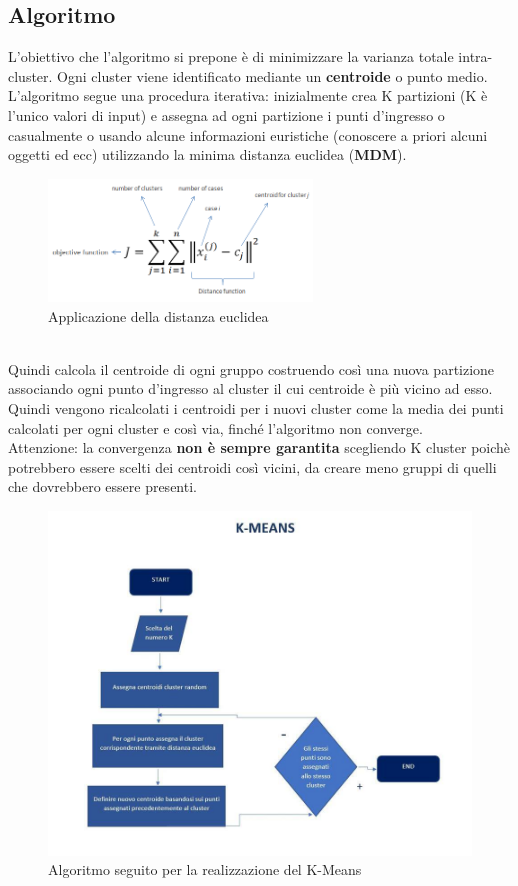 \documentclass[a4paper, oneside]{book}
\begin{document}
\subsection*{Algoritmo}
L'obiettivo che l'algoritmo si prepone è di minimizzare la varianza totale intra-cluster. Ogni cluster viene identificato mediante un \textbf{centroide} o punto medio. L'algoritmo segue una procedura iterativa: inizialmente crea K partizioni (K è l'unico valori di input) e assegna ad ogni partizione i punti d'ingresso o casualmente o usando alcune informazioni euristiche (conoscere a priori alcuni oggetti ed ecc) utilizzando la minima distanza euclidea (\textbf{MDM}).
\begin{figure}[htp]
\centering
\includegraphics[width=7cm]{mdm.png}
\caption{Applicazione della distanza euclidea}
\label{fig:mdm}
\end{figure}
\\
Quindi calcola il centroide di ogni gruppo costruendo così una nuova partizione associando ogni punto d'ingresso al cluster il cui centroide è più vicino ad esso. Quindi vengono ricalcolati i centroidi per i nuovi cluster come la media dei punti calcolati per ogni cluster e così via, finché l'algoritmo non converge. \\
Attenzione: la convergenza \textbf{non è sempre garantita} scegliendo K cluster poichè potrebbero essere scelti dei centroidi così vicini, da creare meno gruppi di quelli che dovrebbero essere presenti.\\
\begin{figure}[htp]
\centering
\includegraphics[width=17cm]{algoritmo.jpg}
\caption{Algoritmo seguito per la realizzazione del K-Means}
\label{fig:algoritmo}
\end{figure}
\end{document}
